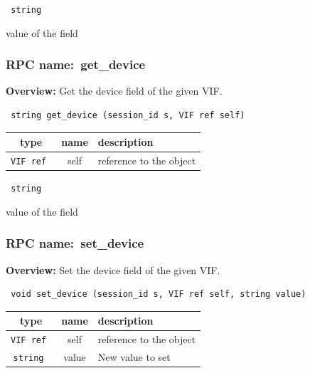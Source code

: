 \vspace{0.3cm}

{\tt 
string
}


value of the field
\vspace{0.3cm}
\vspace{0.3cm}
\vspace{0.3cm}
\subsubsection{RPC name:~get\_device}

{\bf Overview:} 
Get the device field of the given VIF.

\begin{verbatim} string get_device (session_id s, VIF ref self)\end{verbatim}



 
\vspace{0.3cm}
\begin{tabular}{|c|c|p{7cm}|}
 \hline
{\bf type} & {\bf name} & {\bf description} \\ \hline
{\tt VIF ref } & self & reference to the object \\ \hline 

\end{tabular}

\vspace{0.3cm}

{\tt 
string
}


value of the field
\vspace{0.3cm}
\vspace{0.3cm}
\vspace{0.3cm}
\subsubsection{RPC name:~set\_device}

{\bf Overview:} 
Set the device field of the given VIF.

\begin{verbatim} void set_device (session_id s, VIF ref self, string value)\end{verbatim}



 
\vspace{0.3cm}
\begin{tabular}{|c|c|p{7cm}|}
 \hline
{\bf type} & {\bf name} & {\bf description} \\ \hline
{\tt VIF ref } & self & reference to the object \\ \hline 

{\tt string } & value & New value to set \\ \hline 

\end{tabular}

